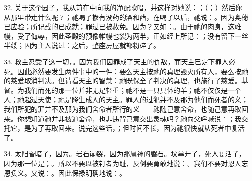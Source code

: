 32. 关于这个园子，我从前在中向我的净配歌唱，并这样对她说：；（；）然后你从那里带走什么呢？；祂喝了掺有没药的酒和醋，在喝了以后，祂说：。因为奥秘已应验；所记载的已成就；罪过已被赦免。因为？又如：。由于祂的肉身，这帷幔，受了侮辱，因此圣殿的预像帷幔也裂为两半，正如经上所记：；没有留下一丝半缕；因为主人说过：之后，整座房屋就都粉碎了。\par

33. 救主忍受了这一切，。因为我们因罪成了天主的仇敌，而天主已定下罪人必死。因此必然要发生两件事中的一件：要么天主按祂的真理毁灭所有人，要么按祂的慈爱取消判决。但请看天主的智慧：祂既保全了判决的真理，也施行了慈爱。基督。为我们而死的那一位并非无足轻重；祂不是一只具体的羊；祂不仅仅是一个人；祂超过天使；祂是降生成人的天主。罪人的过犯并不及那为他们而死者的义；我们所犯的罪并不及那为我们舍命者所行的义——祂随己意舍命，也随己意再取回来。你想知道祂并非被迫舍命，也非违背己意交出灵魂吗？祂向父呼喊说：；我交托它，是为了再取回来。说完这些话，；但时间不长，因为祂很快就从死者中复活了。\par

34. 太阳昏暗了，因为。岩石崩裂，因为那属神的磐石。坟墓开了，死人复活了，因为那一位是；。所以不要以被钉者为耻，反倒要勇敢地说：。我们不要对恩人忘恩负义。又说：。因此保禄明确地说：。\par

